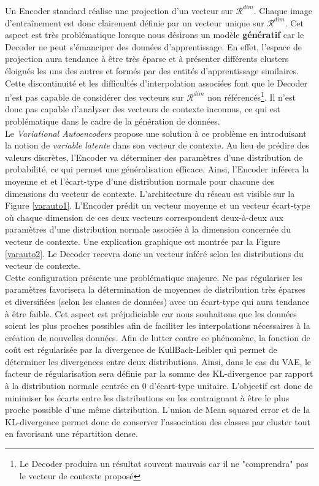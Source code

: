 \noindent Un Encoder standard réalise une projection d'un vecteur sur $\mathcal{R}^{dim}$. Chaque image d'entraînement est donc clairement définie par un vecteur unique sur $\mathcal{R}^{dim}$. Cet aspect est très problématique lorsque nous désirons un modèle \textbf{génératif} car le Decoder ne peut s'émanciper des données d'apprentissage. En effet, l'espace de projection aura tendance à être très éparse et à présenter différents clusters éloignés les uns des autres et formés par des entités d'apprentissage similaires. Cette discontinuité et les difficultés d'interpolation associées font que le Decoder n'est pas capable de considérer des vecteurs sur $\mathcal{R}^{dim}$ non référencés\footnote{Le Decoder produira un résultat souvent mauvais car il ne "comprendra" pas le vecteur de contexte proposé}. Il n'est donc pas capable d'analyser des vecteurs de contexte inconnus, ce qui est problématique dans le cadre de la génération de données.\\

\noindent Le \textit{Variational Autoencoders} propose une solution à ce problème en introduisant la notion de \textit{variable latente} dans son vecteur de contexte. Au lieu de prédire des valeurs discrètes, l'Encoder va déterminer des paramètres d'une distribution de probabilité, ce qui permet une généralisation efficace. Ainsi, l'Encoder inférera la moyenne et et l'écart-type d'une distribution normale pour chacune des dimensions du vecteur de contexte. L'architecture du réseau est visible sur la Figure \ref{varauto1}. L'Encoder prédit un vecteur moyenne et un vecteur écart-type où chaque dimension de ces deux vecteurs correspondent deux-à-deux aux paramètres d'une distribution normale associée à la dimension concernée du vecteur de contexte. Une explication graphique est montrée par la Figure \ref{varauto2}. Le Decoder recevra donc un vecteur inféré selon les distributions du vecteur de contexte.\\

\noindent Cette configuration présente une problématique majeure. Ne pas régulariser les paramètres favorisera la détermination de moyennes de distribution très éparses et diversifiées (selon les classes de données) avec un écart-type qui aura tendance à être faible. Cet aspect est préjudiciable car nous souhaitons que les données soient les plus proches possibles afin de faciliter les interpolations nécessaires à la création de nouvelles données. Afin de lutter contre ce phénomène, la fonction de coût est régularisée par la divergence de KullBack-Leibler qui permet de déterminer les divergences entre deux distributions. Ainsi, dans le cas du VAE, le facteur de régularisation sera définie par la somme des KL-divergence par rapport à la distribution normale centrée en 0 d'écart-type unitaire. L'objectif est donc de minimiser les écarts entre les distributions en les contraignant à être le plus proche possible d'une même distribution. L'union de Mean squared error et de la KL-divergence permet donc de conserver l'association des classes par cluster tout en favorisant une répartition dense.\\

